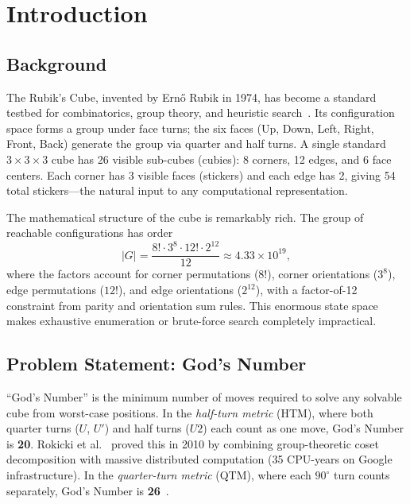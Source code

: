 \documentclass[conference]{IEEEtran}
\begin{document}
\section{Introduction}
\label{sec:intro}

\subsection{Background}
The Rubik's Cube, invented by Ern\H{o} Rubik in 1974, has become a standard testbed for combinatorics, group theory, and heuristic search~\cite{joyner2008}. Its configuration space forms a group under face turns; the six faces (Up, Down, Left, Right, Front, Back) generate the group via quarter and half turns. A single standard $3{\times}3{\times}3$ cube has 26 visible sub-cubes (cubies): 8 corners, 12 edges, and 6 face centers. Each corner has 3 visible faces (stickers) and each edge has 2, giving 54 total stickers---the natural input to any computational representation.

The mathematical structure of the cube is remarkably rich. The group of reachable configurations has order
\begin{equation}
|G| = \frac{8! \cdot 3^8 \cdot 12! \cdot 2^{12}}{12} \approx 4.33 \times 10^{19},
\end{equation}
where the factors account for corner permutations ($8!$), corner orientations ($3^8$), edge permutations ($12!$), and edge orientations ($2^{12}$), with a factor-of-12 constraint from parity and orientation sum rules. This enormous state space makes exhaustive enumeration or brute-force search completely impractical.

\subsection{Problem Statement: God's Number}
``God's Number'' is the minimum number of moves required to solve any solvable cube from worst-case positions. In the \emph{half-turn metric} (HTM), where both quarter turns ($U$, $U'$) and half turns ($U2$) each count as one move, God's Number is \textbf{20}. Rokicki et al.~\cite{godnumber} proved this in 2010 by combining group-theoretic coset decomposition with massive distributed computation (35 CPU-years on Google infrastructure). In the \emph{quarter-turn metric} (QTM), where each $90^\circ$ turn counts separately, God's Number is \textbf{26}~\cite{rokicki2014}.
\end{document}
